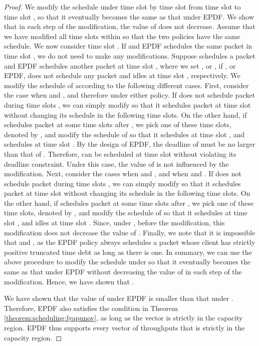 \documentclass[10pt,nocopyrightspace]{sigplan-proc-varsize-1in}
\begin{document}
\begin{proof}
We modify the schedule under  time slot by time slot from time slot  to time slot , so that it eventually becomes the same as that under EPDF. We show that in each step of the modification, the value of  does not decrease. Assume that we have modified all time slots within  so that the two policies have the same schedule. We now consider time slot . If  and EPDF schedules the same packet in time slot , we do not need to make any modifications. Suppose  schedules a packet  and EPDF schedules another packet  at time slot , where we set , or , if , or EPDF, does not schedule any packet and idles at time slot , respectively. We modify the schedule of  according to the following different cases. First, consider the case when  and , and therefore  under either policy. If  does not schedule packet  during time slots , we can simply modify  so that it schedules packet  at time slot  without changing its schedule in the following time slots. On the other hand, if  schedules packet  at some time slots after , we pick one of these time slots, denoted by , and modify the schedule of  so that it schedules  at time slot , and schedules  at time slot . By the design of EPDF, the deadline of  must be no larger than that of . Therefore,  can be scheduled at time slot  without violating its deadline constraint. Under this case, the value of  is not influenced by the modification. Next, consider the cases when  and , and when  and . If  does not schedule packet  during time slots , we can simply modify  so that it schedules packet  at time slot  without changing its schedule in the following time slots. On the other hand, if  schedules packet  at some time slots after , we pick one of these time slots, denoted by , and modify the schedule of  so that it schedules  at time slot , and idles at time slot . Since, under ,  before the modification, this modification does not decrease the value of . Finally, we note that it is impossible that  and , as the EPDF policy always schedules a packet whose client has strictly positive truncated time debt as long as there is one. In summary, we can use the above procedure to modify the schedule under  so that it eventually becomes the same as that under EPDF without decreasing the value of  in each step of the modification. Hence, we have shown that .

We have shown that the value of  under EPDF is smaller than that under . Therefore, EPDF also satisfies the condition in Theorem \ref{theorem:scheduling:lyapunov}, as long as the vector  is strictly in the capacity region. EPDF thus supports every vector of throughputs that is strictly in the capacity region.
\end{proof}
\end{document}
